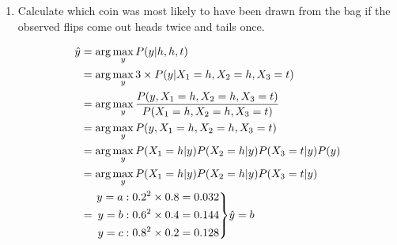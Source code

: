 \documentclass[9pt,a4paper]{extarticle}
\newenvironment{solution}
    {%
    \color{red}
    }
    { 
    \color{black}
    }
\newenvironment{rcases}
  {\left.\begin{aligned}}
  {\end{aligned}\right\rbrace}
\begin{document}
\begin{enumerate}
\begin{solution}
    \end{solution}
    \item Calculate which coin was most likely to have been drawn from the bag if the observed
flips come out heads twice and tails once.
\begin{solution}
\begin{align*}
    \hat{y} &= \arg\max_y P(y|h, h, t)\\
    &= \arg\max_y 3\times P(y|X_1 = h, X_2 = h, X_3 = t)\\
    &= \arg\max_y \frac{P(y, X_1 = h, X_2 = h, X_3 = t)}{P(X_1 = h, X_2 = h, X_3 = t)}\\
    &= \arg\max_y P(y, X_1 = h, X_2 = h, X_3 = t)\\
     &= \arg\max_y P(X_1 = h|y) P(X_2 = h|y) P(X_3 = t|y)P(y)\\
     &=\arg\max_y P(X_1 = h|y) P(X_2 = h|y) P(X_3 = t|y)\\
     &=\begin{rcases}
    y=a &: 0.2^2\times 0.8 = 0.032 \\
    y=b &: 0.6^2\times 0.4=0.144 \\
    y=c &: 0.8^2 \times 0.2=0.128
\end{rcases}
\text{$\hat{y} = b$}\\
\end{align*}
\end{solution}
\end{enumerate}
\end{document}
